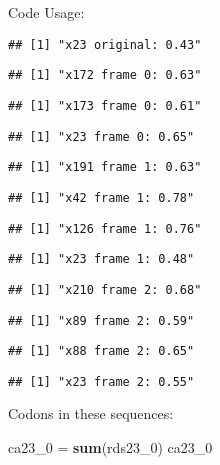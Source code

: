 \documentclass[
]{article}
\newenvironment{Shaded}{\begin{snugshade}}{\end{snugshade}}
\newcommand{\DecValTok}[1]{\textcolor[rgb]{0.00,0.00,0.81}{#1}}
\newcommand{\KeywordTok}[1]{\textcolor[rgb]{0.13,0.29,0.53}{\textbf{#1}}}
\newcommand{\NormalTok}[1]{#1}
\newcommand{\StringTok}[1]{\textcolor[rgb]{0.31,0.60,0.02}{#1}}
\begin{document}
Code Usage:

\begin{verbatim}
## [1] "x23 original: 0.43"
\end{verbatim}

\begin{verbatim}
## [1] "x172 frame 0: 0.63"
\end{verbatim}

\begin{verbatim}
## [1] "x173 frame 0: 0.61"
\end{verbatim}

\begin{verbatim}
## [1] "x23 frame 0: 0.65"
\end{verbatim}

\begin{verbatim}
## [1] "x191 frame 1: 0.63"
\end{verbatim}

\begin{verbatim}
## [1] "x42 frame 1: 0.78"
\end{verbatim}

\begin{verbatim}
## [1] "x126 frame 1: 0.76"
\end{verbatim}

\begin{verbatim}
## [1] "x23 frame 1: 0.48"
\end{verbatim}

\begin{verbatim}
## [1] "x210 frame 2: 0.68"
\end{verbatim}

\begin{verbatim}
## [1] "x89 frame 2: 0.59"
\end{verbatim}

\begin{verbatim}
## [1] "x88 frame 2: 0.65"
\end{verbatim}

\begin{verbatim}
## [1] "x23 frame 2: 0.55"
\end{verbatim}

Codons in these sequences:

\begin{Shaded}
\begin{Highlighting}[]
\NormalTok{ca23_}\DecValTok{0}\NormalTok{ =}\StringTok{ }\KeywordTok{sum}\NormalTok{(rds23_}\DecValTok{0}\NormalTok{)}
\NormalTok{ca23_}\DecValTok{0}
\end{Highlighting}
\end{Shaded}
\end{document}
